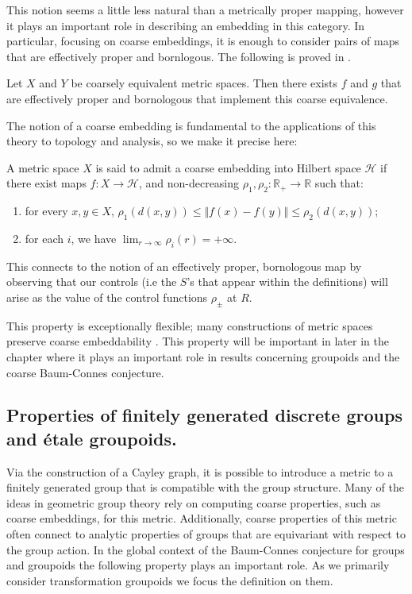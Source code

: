 This notion seems a little less natural than a metrically proper mapping, however it plays an important role in describing an embedding in this category. In particular, focusing on coarse embeddings, it is enough to consider pairs of maps that are effectively proper and bornlogous. The following is proved in \cite{EG-permanence}.

\begin{lemma}
Let $X$ and $Y$ be coarsely equivalent metric spaces. Then there exists $f$ and $g$ that are effectively proper and bornologous that implement this coarse equivalence.
\end{lemma}

The notion of a coarse embedding is fundamental to the applications of this theory to topology and analysis, so we make it precise here:

\begin{definition}\label{def:FCE}
A metric space $X$ is said to admit a coarse embedding into Hilbert space $\mathcal{H}$ if there exist maps $f:X \rightarrow \mathcal{H}$,  and non-decreasing $\rho_{1},\rho_{2}:\mathbb{R}_{+} \rightarrow \mathbb{R}$ such that:
\begin{enumerate}
\item for every $x,y \in X$, $\rho_{1}(d(x,y)) \leq \Vert f(x) - f(y) \Vert \leq \rho_{2}(d(x,y))$;
\item for each $i$, we have $\lim_{r \rightarrow \infty}\rho_{i}(r) = +\infty$.
\end{enumerate}
\end{definition}

This connects to the notion of an effectively proper, bornologous map by observing that our controls (i.e the $S$'s that appear within the definitions) will arise as the value of the control functions $\rho_{\pm}$ at $R$.

This property is exceptionally flexible; many constructions of metric spaces preserve coarse embeddability \cite{EG-permanence}. This property will be important in later in the chapter where it plays an important role in results concerning groupoids and the coarse Baum-Connes conjecture.

\subsection{Properties of finitely generated discrete groups and \'etale groupoids.}
Via the construction of a Cayley graph, it is possible to introduce a metric to a finitely generated group that is compatible with the group structure. Many of the ideas in geometric group theory rely on computing coarse properties, such as coarse embeddings, for this metric. Additionally, coarse properties of this metric often connect to analytic properties of groups that are equivariant with respect to the group action. In the global context of the Baum-Connes conjecture for groups and groupoids the following property plays an important role. As we primarily consider transformation groupoids we focus the definition on them.

